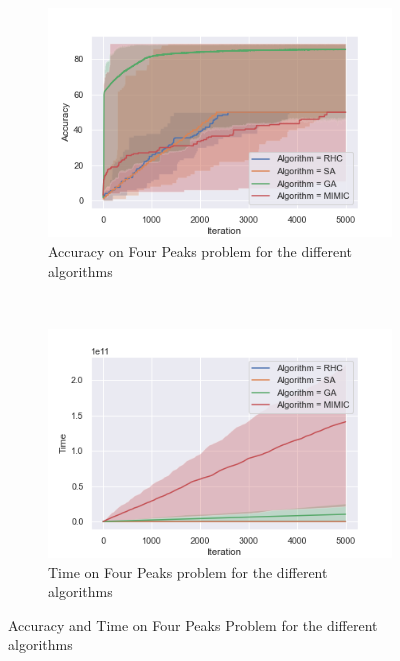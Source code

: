 \documentclass[twocolumn, 10pt]{article}
\begin{document}
				\begin{figure}[h]
					\centering
					\begin{subfigure}[t]{0.45\columnwidth}
						\centering
						\includegraphics[width=\linewidth]{../graphics/four_peaks_all_Iteration_Error_Algorithm.png}
						\caption{Accuracy on Four Peaks problem for the different algorithms}
						\label{fp:all_accuracy}
					\end{subfigure}
					~
					\begin{subfigure}[t]{0.45\columnwidth}
						\centering
						\includegraphics[width=\linewidth]{../graphics/four_peaks_all_Iteration_Time_Algorithm.png}
						\caption{Time on Four Peaks problem for the different algorithms}
						\label{fp:all_time}
					\end{subfigure}
					\caption{Accuracy and Time on Four Peaks Problem for the different algorithms}
					\label{fp:all}
				\end{figure}
\end{document}
